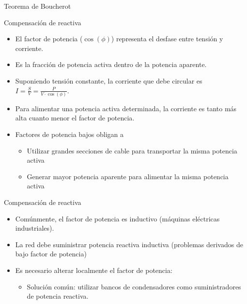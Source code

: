 \documentclass[xcolor={usenames,svgnames,dvipsnames}]{beamer}
\begin{document}
\begin{frame}[label={sec:org1ed7caa}]{Teorema de Boucherot}
\end{frame}
\begin{frame}[label={sec:orgf01c219}]{Compensación de reactiva}
\begin{itemize}
\item El factor de potencia (\(\cos(\phi)\)) representa el desfase entre
tensión y corriente.

\item Es la fracción de potencia activa dentro de la potencia aparente.

\item Suponiendo tensión constante, la corriente que debe circular es
\(I=\frac{S}{V}=\frac{P}{V\cdot\cos(\phi)}\).

\item Para alimentar una potencia activa determinada, \alert{la corriente es
tanto más alta cuanto menor el factor de potencia}.

\item \alert{Factores de potencia bajos} obligan a

\begin{itemize}
\item Utilizar \alert{grandes secciones} de cable para transportar la misma
potencia activa

\item Generar \alert{mayor potencia aparente} para alimentar la misma potencia
activa
\end{itemize}
\end{itemize}
\end{frame}

\begin{frame}[label={sec:org25bd798}]{Compensación de reactiva}
\begin{itemize}
\item Comúnmente, el factor de potencia es \alert{inductivo} (máquinas eléctricas
industriales).

\item La red debe suministrar potencia reactiva inductiva (problemas
derivados de bajo factor de potencia)

\item Es necesario alterar localmente el factor de potencia:

\begin{itemize}
\item Solución común: utilizar \alert{bancos de condensadores} como
suministradores de potencia reactiva.
\end{itemize}
\end{itemize}
\end{frame}
\end{document}
